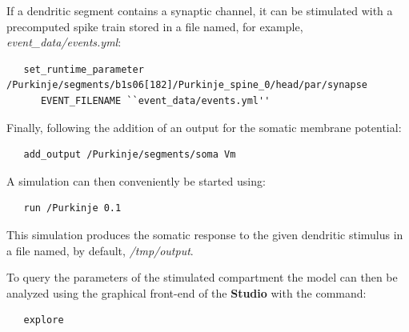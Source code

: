 \documentclass[12pt]{article}
\begin{document}

If a dendritic segment contains a synaptic channel, it can be
stimulated with a precomputed spike train stored in a file named, for
example, {\it event\_data/events.yml}:

\begin{verbatim}
   set_runtime_parameter /Purkinje/segments/b1s06[182]/Purkinje_spine_0/head/par/synapse
      EVENT_FILENAME ``event_data/events.yml''
\end{verbatim}

Finally, following the addition of an output for the somatic membrane
potential:
\begin{verbatim}
   add_output /Purkinje/segments/soma Vm
\end{verbatim}
A simulation can then conveniently be started using:
\begin{verbatim}
   run /Purkinje 0.1
\end{verbatim}
This simulation produces the somatic response to the given dendritic
stimulus in a file named, by default, {\it /tmp/output}.

To query the parameters of the stimulated compartment the model can
then be analyzed using the graphical front-end of the {\bf Studio}
with the command:

\begin{verbatim}
   explore
\end{verbatim}
\end{document}
